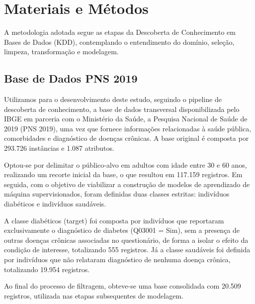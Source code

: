 \documentclass[12pt, a4paper]{article}
\begin{document}
    \newpage

    \section{Materiais e Métodos}

    A metodologia adotada segue as etapas da Descoberta de Conhecimento em Bases de Dados (KDD), contemplando o entendimento do domínio, seleção, limpeza, transformação e modelagem.


        \subsection{Base de Dados PNS 2019}
        Utilizamos para o desenvolvimento deste estudo, seguindo o pipeline de descoberta de conhecimento, a base de dados transversal disponibilizada pelo IBGE em parceria com o Ministério da Saúde, a Pesquisa Nacional de Saúde de 2019 (PNS 2019), uma vez que fornece informações relacionadas à saúde pública, comorbidades e diagnóstico de doenças crônicas. A base original é composta por 293.726 instâncias e 1.087 atributos.
        
        Optou-se por delimitar o público-alvo em adultos com idade entre 30 e 60 anos, realizando um recorte inicial da base, o que resultou em 117.159 registros. Em seguida, com o objetivo de viabilizar a construção de modelos de aprendizado de máquina supervisionados, foram definidas duas classes estritas: indivíduos diabéticos e indivíduos saudáveis.
        
        A classe diabéticos (target) foi composta por indivíduos que reportaram exclusivamente o diagnóstico de diabetes (Q03001 = Sim), sem a presença de outras doenças crônicas associadas no questionário, de forma a isolar o efeito da condição de interesse, totalizando 555 registros. Já a classe saudáveis foi definida por indivíduos que não relataram diagnóstico de nenhuma doença crônica, totalizando 19.954 registros.
        
        Ao final do processo de filtragem, obteve-se uma base consolidada com 20.509 registros, utilizada nas etapas subsequentes de modelagem.
\end{document}

